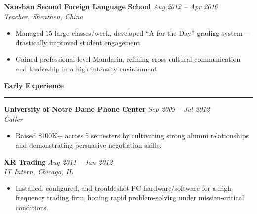 \documentclass[letterpaper,10pt]{article}
\newcommand{\resheading}[1]{
  \vspace{10pt}
  \textbf{\large #1}
  \vspace{5pt}
  \hrule
  \vspace{5pt}
}
\begin{document}
\textbf{Nanshan Second Foreign Language School} \hfill \textit{Aug 2012 -- Apr 2016}\\
\emph{Teacher, Shenzhen, China}\\
\begin{itemize}
  \item Managed 15 large classes/week, developed “A for the Day” grading 
        system—drastically improved student engagement.
  \item Gained professional-level Mandarin, refining cross-cultural 
        communication and leadership in a high-intensity environment.
\end{itemize}

\resheading{Early Experience}
\textbf{University of Notre Dame Phone Center} \hfill \textit{Sep 2009 -- Jul 2012}\\
\emph{Caller}\\
\begin{itemize}
  \item Raised \$100K+ across 5 semesters by cultivating strong alumni 
        relationships and demonstrating persuasive negotiation skills.
\end{itemize}

\textbf{XR Trading} \hfill \textit{Aug 2011 -- Jan 2012}\\
\emph{IT Intern, Chicago, IL}\\
\begin{itemize}
  \item Installed, configured, and troubleshot PC hardware/software for 
        a high-frequency trading firm, honing rapid problem-solving 
        under mission-critical conditions.
\end{itemize}



\end{document}
